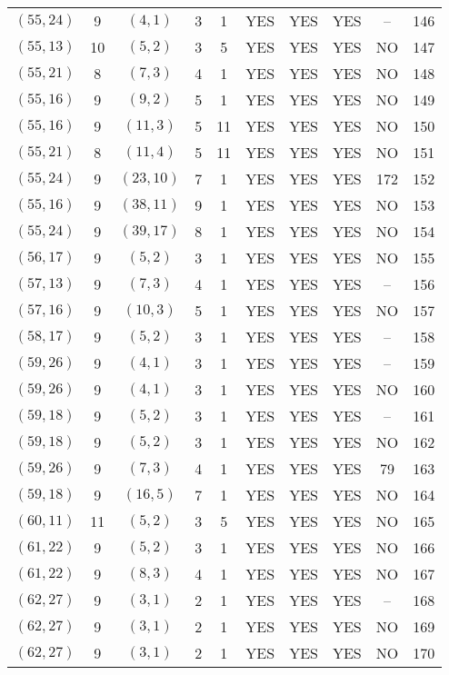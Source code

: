 \begin{longtable}{|c|c|c|c|c|c|c|c|c|c|}
$(55, 24)$ & 9 & $(4, 1)$ & 3 & 1 & YES & YES & YES & -- & 146\\
$(55, 13)$ & 10 & $(5, 2)$ & 3 & 5 & YES & YES & YES & NO & 147\\
$(55, 21)$ & 8 & $(7, 3)$ & 4 & 1 & YES & YES & YES & NO & 148\\
$(55, 16)$ & 9 & $(9, 2)$ & 5 & 1 & YES & YES & YES & NO & 149\\
$(55, 16)$ & 9 & $(11, 3)$ & 5 & 11 & YES & YES & YES & NO & 150\\
$(55, 21)$ & 8 & $(11, 4)$ & 5 & 11 & YES & YES & YES & NO & 151\\
$(55, 24)$ & 9 & $(23, 10)$ & 7 & 1 & YES & YES & YES & 172 & 152\\
$(55, 16)$ & 9 & $(38, 11)$ & 9 & 1 & YES & YES & YES & NO & 153\\
$(55, 24)$ & 9 & $(39, 17)$ & 8 & 1 & YES & YES & YES & NO & 154\\
$(56, 17)$ & 9 & $(5, 2)$ & 3 & 1 & YES & YES & YES & NO & 155\\
$(57, 13)$ & 9 & $(7, 3)$ & 4 & 1 & YES & YES & YES & -- & 156\\
$(57, 16)$ & 9 & $(10, 3)$ & 5 & 1 & YES & YES & YES & NO & 157\\
$(58, 17)$ & 9 & $(5, 2)$ & 3 & 1 & YES & YES & YES & -- & 158\\
$(59, 26)$ & 9 & $(4, 1)$ & 3 & 1 & YES & YES & YES & -- & 159\\
$(59, 26)$ & 9 & $(4, 1)$ & 3 & 1 & YES & YES & YES & NO & 160\\
$(59, 18)$ & 9 & $(5, 2)$ & 3 & 1 & YES & YES & YES & -- & 161\\
$(59, 18)$ & 9 & $(5, 2)$ & 3 & 1 & YES & YES & YES & NO & 162\\
$(59, 26)$ & 9 & $(7, 3)$ & 4 & 1 & YES & YES & YES & 79 & 163\\
$(59, 18)$ & 9 & $(16, 5)$ & 7 & 1 & YES & YES & YES & NO & 164\\
$(60, 11)$ & 11 & $(5, 2)$ & 3 & 5 & YES & YES & YES & NO & 165\\
$(61, 22)$ & 9 & $(5, 2)$ & 3 & 1 & YES & YES & YES & NO & 166\\
$(61, 22)$ & 9 & $(8, 3)$ & 4 & 1 & YES & YES & YES & NO & 167\\
$(62, 27)$ & 9 & $(3, 1)$ & 2 & 1 & YES & YES & YES & -- & 168\\
$(62, 27)$ & 9 & $(3, 1)$ & 2 & 1 & YES & YES & YES & NO & 169\\
$(62, 27)$ & 9 & $(3, 1)$ & 2 & 1 & YES & YES & YES & NO & 170\\

\end{longtable}
